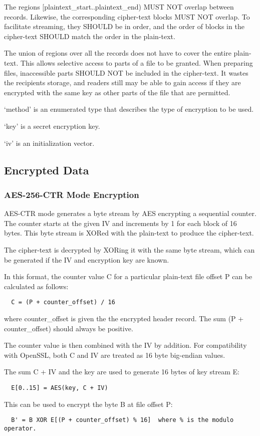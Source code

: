 \documentclass[10pt]{article}
\begin{document}
The regions [plaintext\_start..plaintext\_end) MUST NOT overlap between records.
Likewise, the corresponding cipher-text blocks MUST NOT overlap.
To facilitate streaming, they SHOULD be in order, and the order of blocks in the cipher-text SHOULD match the order
in the plain-text.

The union of regions over all the records does not have to cover the entire plain-text.
This allows selective access to parts of a file to be granted.
When preparing files, inaccessible parts SHOULD NOT be included in the cipher-text.
It wastes the recipients storage, and readers still may be able to gain access if they are encrypted with the same key
as other parts of the file that are permitted.

`method' is an enumerated type that describes the type of encryption to be used.

`key' is a secret encryption key.

`iv' is an initialization vector.

\subsection{Encrypted Data}
\subsubsection{AES-256-CTR Mode Encryption}

AES-CTR mode generates a byte stream by AES encrypting a sequential counter.
The counter starts at the given IV and increments by 1 for each block of 16 bytes.
This byte stream is XORed with the plain-text to produce the cipher-text.

The cipher-text is decrypted by XORing it with the same byte stream, which can be generated if the IV and encryption
key are known.

In this format, the counter value C for a particular plain-text file offset P can be calculated as follows:
\begin{verbatim}
  C = (P + counter_offset) / 16
\end{verbatim}
where counter\_offset is given the the encrypted header record.
The sum (P + counter\_offset) should always be positive.

The counter value is then combined with the IV by addition.
For compatibility with OpenSSL, both C and IV are treated as 16 byte big-endian values.

The sum C + IV and the key are used to generate 16 bytes of key stream E:
\begin{verbatim}
  E[0..15] = AES(key, C + IV)
\end{verbatim}
  This can be used to encrypt the byte B at file offset P:
\begin{verbatim}
  B' = B XOR E[(P + counter_offset) % 16]  where % is the modulo operator.
\end{verbatim}
\end{document}
